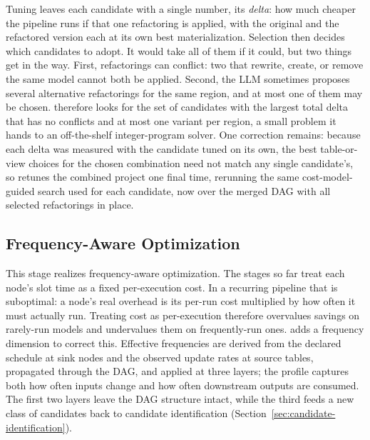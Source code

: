 Tuning leaves each candidate with a single number, its \emph{delta}: how much cheaper the pipeline runs if that one refactoring is applied, with the original and the refactored version each at its own best materialization. Selection then decides which candidates to adopt. It would take all of them if it could, but two things get in the way. First, refactorings can conflict: two that rewrite, create, or remove the same model cannot both be applied. Second, the LLM sometimes proposes several alternative refactorings for the same region, and at most one of them may be chosen. \tool{} therefore looks for the set of candidates with the largest total delta that has no conflicts and at most one variant per region, a small problem it hands to an off-the-shelf integer-program solver. One correction remains: because each delta was measured with the candidate tuned on its own, the best table-or-view choices for the chosen combination need not match any single candidate's, so \tool{} retunes the combined project one final time, rerunning the same cost-model-guided search used for each candidate, now over the merged DAG with all selected refactorings in place. 





\subsection{Frequency-Aware Optimization}
\label{sec:frequency}

This stage realizes frequency-aware optimization. The stages so far treat each node's slot time as a fixed per-execution cost. In a recurring pipeline that is suboptimal: a node's real overhead is its per-run cost multiplied by how often it must actually run. Treating cost as per-execution therefore overvalues savings on rarely-run models and undervalues them on frequently-run ones. \tool{} adds a frequency dimension to correct this. Effective frequencies are derived from the declared schedule at sink nodes and the observed update rates at source tables, propagated through the DAG, and applied at three layers;  the profile captures both how often inputs change and how often downstream outputs are consumed.  The first two layers leave the DAG structure intact, while the third feeds a new class of candidates back to candidate identification (Section~\ref{sec:candidate-identification}).

